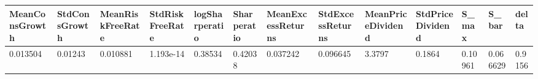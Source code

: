\begin{tabular}{lllllllllllll}
MeanConsGrowth & StdConsGrowth & MeanRiskFreeRate & StdRiskFreeRate & logSharperatio & Sharperatio & MeanExcessReturns & StdExcessReturns & MeanPriceDividend & StdPriceDividend & S_max & S_bar & delta \\ 
\toprule 
0.013504 & 0.01243 & 0.010881 & 1.193e-14 & 0.38534 & 0.42038 & 0.037242 & 0.096645 & 3.3797 & 0.1864 & 0.10961 & 0.066629 & 0.9156 \\ 
\bottomrule 
\end{tabular}